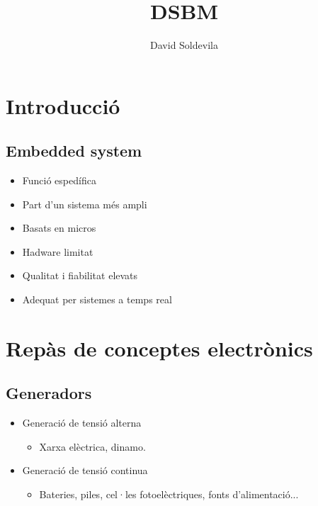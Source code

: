 \documentclass{article}
\title{DSBM}
\author{David Soldevila}
\begin{document}
\maketitle

\pagebreak

\tableofcontents

\pagebreak

\section{Introducció}

\subsection{Embedded system}

\begin{itemize}
	\item Funció espedífica
	\item Part d'un sistema més ampli
	\item Basats en micros
	\item Hadware limitat
	\item Qualitat i fiabilitat elevats
	\item Adequat per sistemes a temps real
\end{itemize}

\pagebreak

\section{Repàs de conceptes electrònics}

\subsection{Generadors}

\begin{itemize}
	\item Generació de tensió alterna
	\begin{itemize}
		\item Xarxa elèctrica, dinamo.
	\end{itemize}
	\item Generació de tensió continua
	\begin{itemize}
		 \item Bateries, piles, cel·les fotoelèctriques, fonts d'alimentació...
	\end{itemize}
\end{itemize}
\end{document}

